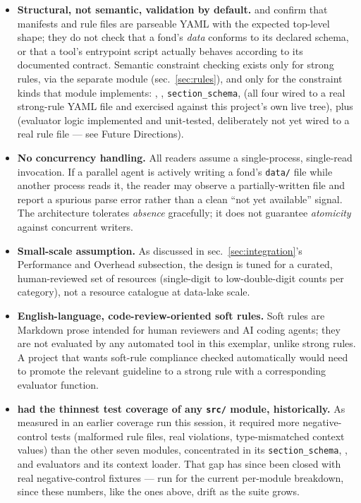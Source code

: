 \documentclass[
]{article}
\providecommand{\tightlist}{%
  \setlength{\itemsep}{0pt}\setlength{\parskip}{0pt}}
\begin{document}
\begin{itemize}
\tightlist
\item
  \textbf{Structural, not semantic, validation by default.}
   and 
  confirm that manifests and rule files are parseable YAML with the
  expected top-level shape; they do not check that a fond's \emph{data}
  conforms to its declared schema, or that a tool's entrypoint script
  actually behaves according to its documented contract. Semantic
  constraint checking exists only for strong rules, via the separate
   module (sec.~\ref{sec:rules}), and
  only for the constraint kinds that module implements:
  , ,
  \texttt{section\_schema},  (all four wired
  to a real strong-rule YAML file and exercised against this project's
  own live tree), plus  (evaluator logic
  implemented and unit-tested, deliberately not yet wired to a real rule
  file --- see Future Directions).
\item
  \textbf{No concurrency handling.} All readers assume a single-process,
  single-read invocation. If a parallel agent is actively writing a
  fond's \texttt{data/} file while another process reads it, the reader
  may observe a partially-written file and report a spurious parse error
  rather than a clean ``not yet available'' signal. The architecture
  tolerates \emph{absence} gracefully; it does not guarantee
  \emph{atomicity} against concurrent writers.
\item
  \textbf{Small-scale assumption.} As discussed in
  sec.~\ref{sec:integration}'s Performance and Overhead subsection, the
  design is tuned for a curated, human-reviewed set of resources
  (single-digit to low-double-digit counts per category), not a resource
  catalogue at data-lake scale.
\item
  \textbf{English-language, code-review-oriented soft rules.} Soft rules
  are Markdown prose intended for human reviewers and AI coding agents;
  they are not evaluated by any automated tool in this exemplar, unlike
  strong rules. A project that wants soft-rule compliance checked
  automatically would need to promote the relevant guideline to a strong
  rule with a corresponding evaluator function.
\item
  \textbf{ had the thinnest test
  coverage of any \texttt{src/} module, historically.} As measured in an
  earlier coverage run this session, it required more negative-control
  tests (malformed rule files, real violations, type-mismatched context
  values) than the other seven modules, concentrated in its
  \texttt{section\_schema}, , and
   evaluators and its context loader. That gap
  has since been closed with real negative-control fixtures --- run
   for the
  current per-module breakdown, since these numbers, like the ones
  above, drift as the suite grows.
\end{itemize}
\end{document}
